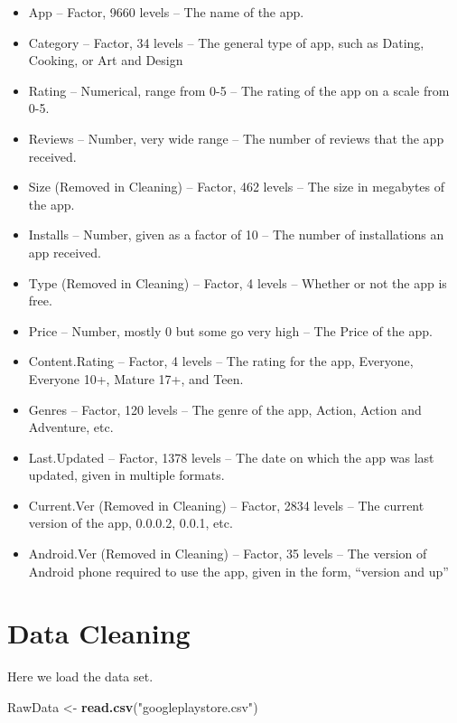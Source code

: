 \documentclass[]{article}
\newenvironment{Shaded}{\begin{snugshade}}{\end{snugshade}}
\newcommand{\KeywordTok}[1]{\textcolor[rgb]{0.13,0.29,0.53}{\textbf{{#1}}}}
\newcommand{\StringTok}[1]{\textcolor[rgb]{0.31,0.60,0.02}{{#1}}}
\newcommand{\NormalTok}[1]{{#1}}
\begin{document}
\begin{itemize}
\item
  App -- Factor, 9660 levels -- The name of the app.
\item
  Category -- Factor, 34 levels -- The general type of app, such as
  Dating, Cooking, or Art and Design
\item
  Rating -- Numerical, range from 0-5 -- The rating of the app on a
  scale from 0-5.
\item
  Reviews -- Number, very wide range -- The number of reviews that the
  app received.
\item
  Size (Removed in Cleaning) -- Factor, 462 levels -- The size in
  megabytes of the app.
\item
  Installs -- Number, given as a factor of 10 -- The number of
  installations an app received.
\item
  Type (Removed in Cleaning) -- Factor, 4 levels -- Whether or not the
  app is free.
\item
  Price -- Number, mostly 0 but some go very high -- The Price of the
  app.
\item
  Content.Rating -- Factor, 4 levels -- The rating for the app,
  Everyone, Everyone 10+, Mature 17+, and Teen.
\item
  Genres -- Factor, 120 levels -- The genre of the app, Action, Action
  and Adventure, etc.
\item
  Last.Updated -- Factor, 1378 levels -- The date on which the app was
  last updated, given in multiple formats.
\item
  Current.Ver (Removed in Cleaning) -- Factor, 2834 levels -- The
  current version of the app, 0.0.0.2, 0.0.1, etc.
\item
  Android.Ver (Removed in Cleaning) -- Factor, 35 levels -- The version
  of Android phone required to use the app, given in the form, ``version
  and up''
\end{itemize}

\section{Data Cleaning}\label{data-cleaning}

Here we load the data set.

\begin{Shaded}
\begin{Highlighting}[]
\NormalTok{RawData <-}\StringTok{ }\KeywordTok{read.csv}\NormalTok{(}\StringTok{"googleplaystore.csv"}\NormalTok{)}
\end{Highlighting}
\end{Shaded}
\end{document}
